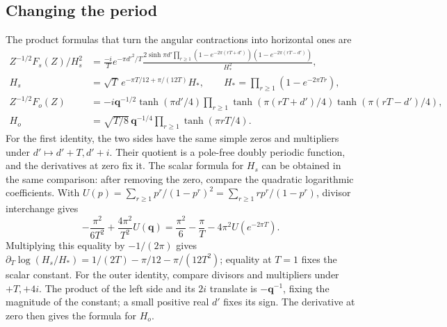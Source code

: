 \subsection{Changing the period}

The product formulas that turn the angular contractions into horizontal
ones are
\begin{equation}\label{c7:modular-products}
\begin{split}
Z^{-1/2}F_s(Z)/H_s^2
&=\frac{-i}{T}e^{-\pi d'^2/T}
 \frac{2\sinh\pi d'\prod_{r\ge1}
 (1-e^{-2\pi(rT+d')})(1-e^{-2\pi(rT-d')})}{H_*^2},\\
H_s&=\sqrt T\,e^{-\pi T/12+\pi/(12T)}H_*,
\qquad H_*=\prod_{r\ge1}(1-e^{-2\pi Tr}),\\
Z^{-1/2}F_o(Z)
&=-i\mathbf q^{-1/2}\tanh(\pi d'/4)
 \prod_{r\ge1}\tanh(\pi(rT+d')/4)\tanh(\pi(rT-d')/4),\\
H_o&=\sqrt{T/8}\,\mathbf q^{-1/4}
 \prod_{r\ge1}\tanh(\pi rT/4).
\end{split}
\end{equation}
For the first identity, the two sides have the same simple zeros and
multipliers under $d'\mapsto d'+T,d'+i$.  Their quotient is a pole-free
doubly periodic function, and the derivatives at zero fix it.  The scalar
formula for $H_s$ can be obtained in the same comparison: after removing the
zero, compare the quadratic logarithmic coefficients.  With
$U(p)=\sum_{r\ge1}p^r/(1-p^r)^2=\sum_{r\ge1}rp^r/(1-p^r)$, divisor
interchange gives
\[
-\frac{\pi^2}{6T^2}+\frac{4\pi^2}{T^2}U(\mathbf q)
=\frac{\pi^2}{6}-\frac\pi T-4\pi^2U(e^{-2\pi T}).
\]
Multiplying this equality by $-1/(2\pi)$ gives
$\partial_T\log(H_s/H_*)=1/(2T)-\pi/12-\pi/(12T^2)$;
equality at $T=1$ fixes the scalar constant.  For the outer identity, compare
divisors and multipliers under $+T,+4i$.  The product of the left side and
its $2i$ translate is $-\mathbf q^{-1}$, fixing the magnitude of the
constant; a small positive real $d'$ fixes its sign.  The derivative at zero
then gives the formula for $H_o$.

